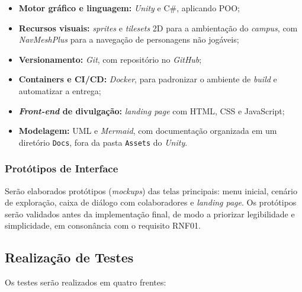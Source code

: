 \documentclass[12pt, a4paper]{article}
\begin{document}
\begin{itemize}
    \item \textbf{Motor gráfico e linguagem:} \textit{Unity} e C\#, aplicando
    POO;

    \item \textbf{Recursos visuais:} \textit{sprites} e \textit{tilesets} 2D para
    a ambientação do \textit{campus}, com \textit{NavMeshPlus} para a navegação de
    personagens não jogáveis;

    \item \textbf{Versionamento:} \textit{Git}, com repositório no \textit{GitHub};

    \item \textbf{Containers e CI/CD:} \textit{Docker}, para padronizar o ambiente
    de \textit{build} e automatizar a entrega;

    \item \textbf{\textit{Front-end} de divulgação:} \textit{landing page} com
    HTML, CSS e JavaScript;

    \item \textbf{Modelagem:} UML e \textit{Mermaid}, com documentação organizada
    em um diretório \texttt{Docs}, fora da pasta \texttt{Assets} do \textit{Unity}.
\end{itemize}

\subsubsection{Protótipos de Interface}

Serão elaborados protótipos (\textit{mockups}) das telas principais: menu inicial,
cenário de exploração, caixa de diálogo com colaboradores e \textit{landing page}.
Os protótipos serão validados antes da implementação final, de modo a priorizar
legibilidade e simplicidade, em consonância com o requisito RNF01.

\subsection{Realização de Testes}

Os testes serão realizados em quatro frentes:
\end{document}

